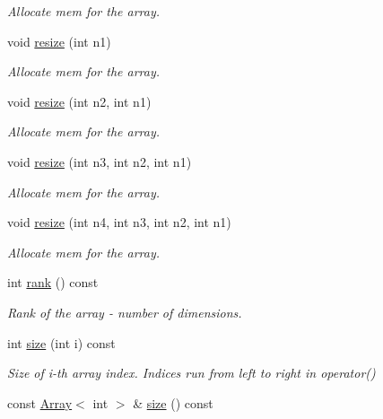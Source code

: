 \begin{DoxyCompactItemize}
\begin{DoxyCompactList}\small\item\em Allocate mem for the array. \end{DoxyCompactList}\item 
void \mbox{\hyperlink{classADAT_1_1ArrayNd_a31eb805d0f039712a9b83609dd828d91}{resize}} (int n1)
\begin{DoxyCompactList}\small\item\em Allocate mem for the array. \end{DoxyCompactList}\item 
void \mbox{\hyperlink{classADAT_1_1ArrayNd_ac66a29c373d99ae8ead2344c1024489e}{resize}} (int n2, int n1)
\begin{DoxyCompactList}\small\item\em Allocate mem for the array. \end{DoxyCompactList}\item 
void \mbox{\hyperlink{classADAT_1_1ArrayNd_a1b042ead88dae6696d7a0c77fd01ddfa}{resize}} (int n3, int n2, int n1)
\begin{DoxyCompactList}\small\item\em Allocate mem for the array. \end{DoxyCompactList}\item 
void \mbox{\hyperlink{classADAT_1_1ArrayNd_a2a54d490a8a0a7aa9aeeaee6e6a84b90}{resize}} (int n4, int n3, int n2, int n1)
\begin{DoxyCompactList}\small\item\em Allocate mem for the array. \end{DoxyCompactList}\item 
int \mbox{\hyperlink{classADAT_1_1ArrayNd_a3f681a80aee7e76cc959431f45d931f8}{rank}} () const
\begin{DoxyCompactList}\small\item\em Rank of the array -\/ number of dimensions. \end{DoxyCompactList}\item 
int \mbox{\hyperlink{classADAT_1_1ArrayNd_aa289b2d57b41dc1c61d061865e6cb912}{size}} (int i) const
\begin{DoxyCompactList}\small\item\em Size of i-\/th array index. Indices run from left to right in operator() \end{DoxyCompactList}\item 
const \mbox{\hyperlink{classXMLArray_1_1Array}{Array}}$<$ int $>$ \& \mbox{\hyperlink{classADAT_1_1ArrayNd_a81494e519c7c5fae6e7ef2e2b46ba24b}{size}} () const

\end{DoxyCompactItemize}
